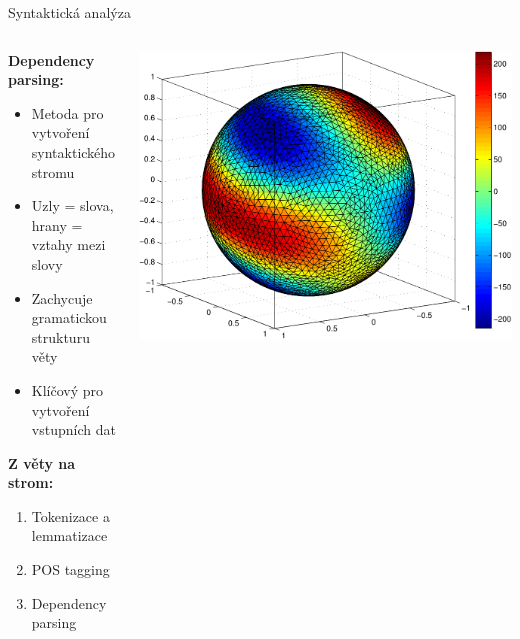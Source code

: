 \documentclass[lualatex,hyperref={pdfencoding=auto}]{beamer}
\begin{document}
\begin{frame}{Syntaktická analýza}
  \begin{columns}
    \begin{column}{0.55\textwidth}
      \textbf{Dependency parsing:}
      \begin{itemize}
        \item Metoda pro vytvoření syntaktického stromu
        \item Uzly = slova, hrany = vztahy mezi slovy
        \item Zachycuje gramatickou strukturu věty
        \item Klíčový pro vytvoření vstupních dat
      \end{itemize}
      \vspace{3mm}
      \textbf{Z věty na strom:}
      \begin{enumerate}
        \item Tokenizace a lemmatizace
        \item POS tagging
        \item Dependency parsing
      \end{enumerate}
    \end{column}
    \begin{column}{0.45\textwidth}
      \includegraphics[width=\textwidth]{fig/sphere_mix_real.pdf}
    \end{column}
  \end{columns}
\end{frame}
\end{document}
